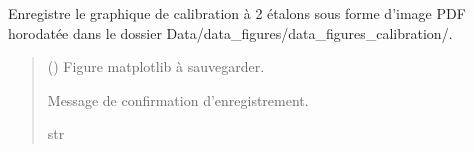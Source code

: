 \documentclass[letterpaper,10pt,english]{sphinxmanual}
\begin{document}

\begin{fulllineitems}
\label{\detokenize{calibration:calibration.enregistrement_cal2_pdf}}
\pysigstartsignatures
\pysiglinewithargsret
{}
{}
{}
\pysigstopsignatures
\sphinxAtStartPar

Enregistre le graphique de calibration à 2 étalons sous forme d’image PDF
horodatée dans le dossier Data/data\_figures/data\_figures\_calibration/.
\begin{quote}\begin{description}
\sphinxAtStartPar
{} () \textendash{} Figure matplotlib à sauvegarder.

\sphinxAtStartPar
Message de confirmation d’enregistrement.

\sphinxAtStartPar
str

\end{description}\end{quote}

\end{fulllineitems}

\end{document}
